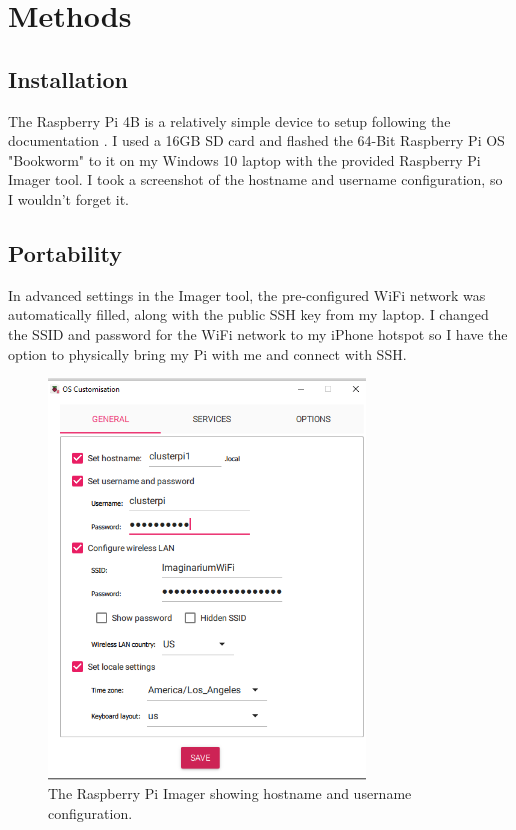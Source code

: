 \documentclass[12pt]{article}
\begin{document}
\section{Methods}\label{sec:methods}

\subsection{Installation}
The Raspberry Pi 4B is a relatively simple device to setup following the documentation \cite{raspberrypi_config}. I used a 16GB SD card and flashed the 64-Bit Raspberry Pi OS "Bookworm" to it on my Windows 10 laptop with the provided Raspberry Pi Imager tool. I took a screenshot of the hostname and username configuration, so I wouldn't forget it.

\subsection{Portability}
In advanced settings in the Imager tool, the pre-configured WiFi network was automatically filled, along with the public SSH key from my laptop. I changed the SSID and password for the WiFi network to my iPhone hotspot so I have the option to physically bring my Pi with me and connect with SSH. 

\begin{figure}[h]
\centering
\includegraphics[width=0.75\textwidth]{raspiconfig.png} %
\caption{The Raspberry Pi Imager showing hostname and username configuration.}
\label{fig:raspiconfig}
\end{figure}
\end{document}
